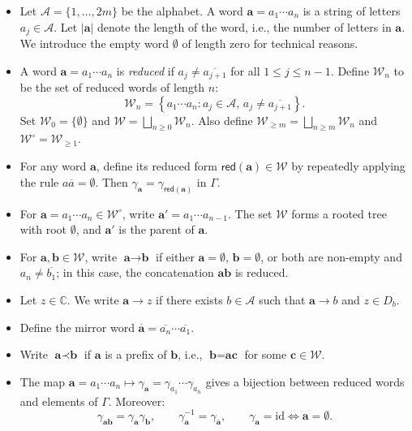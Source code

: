 \documentclass[12pt,letterpaper]{amsart}
\theoremstyle{plain}
\theoremstyle{definition}
\theoremstyle{remark}
\newcommand{\Aa}{\textbf{a}}
\newcommand{\Bb}{\textbf{b}}
\newcommand{\Cc}{\textbf{c}}
\newcommand{\CC}{\mathbb{C}}
\begin{document}
\begin{itemize}
\setlength\itemsep{1em}

\item Let $\mathcal{A} = \{1, \dots, 2m\}$ be the alphabet. A word $\Aa = a_1 \cdots a_n$ is a string of letters $a_j \in \mathcal{A}$. Let $|\Aa|$ denote the length of the word, i.e., the number of letters in $\Aa.$
We introduce the empty word $\emptyset$ of length zero for technical reasons.

\item A word $\Aa = a_1 \cdots a_n$ is \textit{reduced} if $a_j \ne \overline{a_{j+1}}$ for all $1 \le j \le n-1$. Define $\mathcal{W}_n$ to be the set of reduced words of length $n$:
\[
\mathcal{W}_n = \left\{ a_1 \cdots a_n : a_j \in \mathcal{A},\, a_j \ne \overline{a_{j+1}} \right\}.
\]
Set $\mathcal{W}_0 = \{\emptyset\}$ and $\mathcal{W} = \bigsqcup_{n \ge 0} \mathcal{W}_n$. Also define $\mathcal{W}_{\ge m} = \bigsqcup_{n \ge m} \mathcal{W}_n$ and $\mathcal{W}^\circ = \mathcal{W}_{\ge 1}$.

\item For any word $\Aa$, define its reduced form $\mathsf{red}(\Aa) \in \mathcal{W}$ by repeatedly applying the rule $a \overline{a} = \emptyset$. Then $\gamma_\Aa = \gamma_{\mathsf{red}(\Aa)}$ in $\Gamma$.

\item For $\Aa = a_1 \cdots a_n \in \mathcal{W}^\circ$, write $\Aa' = a_1 \cdots a_{n-1}$. The set $\mathcal{W}$ forms a rooted tree with root $\emptyset$, and $\Aa'$ is the parent of $\Aa$.

\item For $\Aa, \Bb \in \mathcal{W}$, write $\Aa \to \Bb$ if either $\Aa = \emptyset$, $\Bb = \emptyset$, or both are non-empty and $a_n \ne \overline{b_1}$; in this case, the concatenation $\Aa\Bb$ is reduced.

\item Let $z\in \CC.$ We write $\Aa \to z$ if there exists $b \in \mathcal{A}$ such that $\Aa \to b$ and $z \in D_b$.

\item Define the mirror word $\overline{\Aa} = \overline{a_n} \cdots \overline{a_1}$.

\item Write $\Aa \prec \Bb$ if $\Aa$ is a prefix of $\Bb$, i.e., $\Bb = \Aa\Cc$ for some $\Cc \in \mathcal{W}$.

\item The map $\Aa = a_1 \cdots a_n \mapsto \gamma_\Aa = \gamma_{a_1} \cdots \gamma_{a_n}$ gives a bijection between reduced words and elements of $\Gamma$. Moreover:
\[
\gamma_{\Aa\Bb} = \gamma_\Aa \gamma_\Bb, \qquad \gamma_\Aa^{-1} = \gamma_{\overline{\Aa}}, \qquad \gamma_\Aa = \mathrm{id} \iff \Aa = \emptyset.
\]


\end{itemize}
\end{document}
